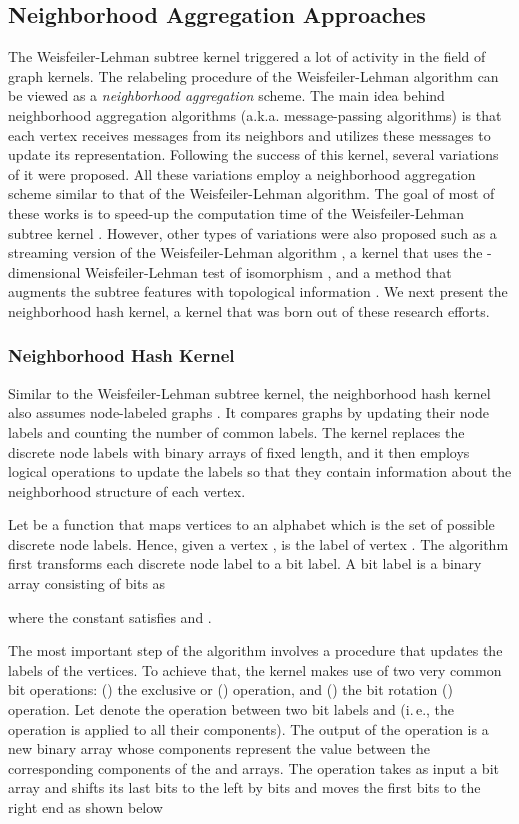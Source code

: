 \documentclass[twoside,11pt]{article}
\newcommand{\ie}{i.\,e., }
\begin{document}
\subsection{Neighborhood Aggregation Approaches}
The Weisfeiler-Lehman subtree kernel triggered a lot of activity in the field of graph kernels.
The relabeling procedure of the Weisfeiler-Lehman algorithm can be viewed as a \textit{neighborhood aggregation} scheme.
The main idea behind neighborhood aggregation algorithms (a.k.a. message-passing algorithms) is that each vertex receives messages from its neighbors and utilizes these messages to update its representation.
Following the success of this kernel, several variations of it were proposed.
All these variations employ a neighborhood aggregation scheme similar to that of the Weisfeiler-Lehman algorithm.
The goal of most of these works is to speed-up the computation time of the Weisfeiler-Lehman subtree kernel .
However, other types of variations were also proposed such as a streaming version of the Weisfeiler-Lehman algorithm , a kernel that uses the -dimensional Weisfeiler-Lehman test of isomorphism , and a method that augments the subtree features with topological information .
We next present the neighborhood hash kernel, a kernel that was born out of these research efforts.

\subsubsection{Neighborhood Hash Kernel}
Similar to the Weisfeiler-Lehman subtree kernel, the neighborhood hash kernel also assumes node-labeled graphs .
It compares graphs by updating their node labels and counting the number of common labels.
The kernel replaces the discrete node labels with binary arrays of fixed length, and it then employs logical operations to update the labels so that they contain information about the neighborhood structure of each vertex.

Let  be a function that maps vertices to an alphabet  which is the set of possible discrete node labels.
Hence, given a vertex ,  is the label of vertex .
The algorithm first transforms each discrete node label to a bit label.
A bit label is a binary array consisting of  bits as

where the constant  satisfies  and .

The most important step of the algorithm involves a procedure that updates the labels of the vertices.
To achieve that, the kernel makes use of two very common bit operations: () the exclusive or () operation, and () the bit rotation () operation.
Let  denote the  operation between two bit labels  and  (\ie the  operation is applied to all their components).
The output of the operation is a new binary array whose components represent the  value between the corresponding components of the  and  arrays.
The  operation takes as input a bit array and shifts its last  bits to the left by  bits and moves the first  bits to the right end as shown below  
\end{document}
